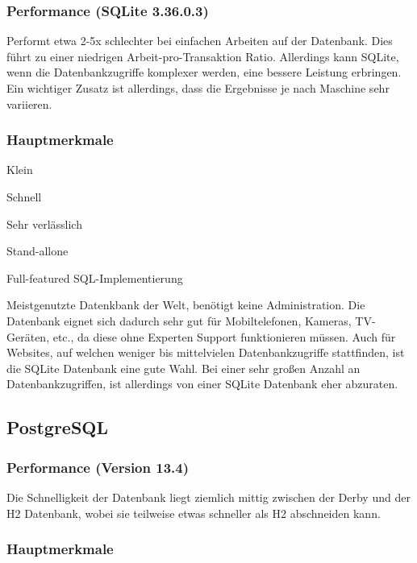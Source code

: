 \subsubsection{Performance (SQLite 3.36.0.3)}
Performt etwa 2-5x schlechter bei einfachen Arbeiten auf der Datenbank. Dies führt zu einer niedrigen Arbeit-pro-Transaktion Ratio. Allerdings kann SQLite, wenn die Datenbankzugriffe komplexer werden, eine bessere Leistung erbringen. Ein wichtiger Zusatz ist allerdings, dass die Ergebnisse je nach Maschine sehr variieren. 

\subsubsection{Hauptmerkmale}

\begin{compactitem}
    \item Klein
    \item Schnell         
    \item Sehr verlässlich
    \item Stand-allone
    \item Full-featured SQL-Implementierung
\end{compactitem}

Meistgenutzte Datenkbank der Welt, benötigt keine Administration. Die Datenbank eignet sich dadurch sehr gut für Mobiltelefonen, Kameras, TV-Geräten, etc., da diese ohne Experten Support funktionieren müssen. Auch für Websites, auf welchen weniger bis mittelvielen Datenbankzugriffe stattfinden, ist die SQLite Datenbank eine gute Wahl. Bei einer sehr großen Anzahl an Datenbankzugriffen, ist allerdings von einer SQLite Datenbank eher abzuraten. 

\subsection{PostgreSQL}
\subsubsection{Performance (Version 13.4)}
Die Schnelligkeit der Datenbank liegt ziemlich mittig zwischen der Derby und der H2 Datenbank, wobei sie teilweise etwas schneller als H2 abschneiden kann. 

\subsubsection{Hauptmerkmale}

